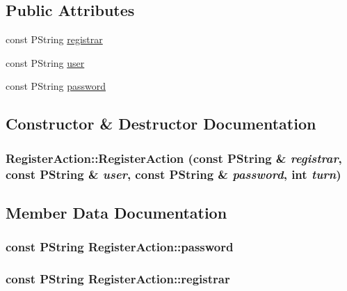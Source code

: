 \subsection*{Public Attributes}
\begin{CompactItemize}
\item 
const PString \hyperlink{classRegisterAction_ac35a1ac2065a7114718b44d205ee8bd}{registrar}
\item 
const PString \hyperlink{classRegisterAction_aa4a6618f15066d50aec6d2a4b07d20f}{user}
\item 
const PString \hyperlink{classRegisterAction_55bb90773d5147d594f8601706a1bcc7}{password}
\end{CompactItemize}


\subsection{Constructor \& Destructor Documentation}
\hypertarget{classRegisterAction_955eec21894f1c59ad8e9692430476f9}{
\subsubsection[{RegisterAction}]{\setlength{\rightskip}{0pt plus 5cm}RegisterAction::RegisterAction (const PString \& {\em registrar}, \/  const PString \& {\em user}, \/  const PString \& {\em password}, \/  int {\em turn})}}
\label{classRegisterAction_955eec21894f1c59ad8e9692430476f9}




\subsection{Member Data Documentation}
\hypertarget{classRegisterAction_55bb90773d5147d594f8601706a1bcc7}{
\subsubsection[{password}]{\setlength{\rightskip}{0pt plus 5cm}const PString {\bf RegisterAction::password}}}
\label{classRegisterAction_55bb90773d5147d594f8601706a1bcc7}


\hypertarget{classRegisterAction_ac35a1ac2065a7114718b44d205ee8bd}{
\subsubsection[{registrar}]{\setlength{\rightskip}{0pt plus 5cm}const PString {\bf RegisterAction::registrar}}}
\label{classRegisterAction_ac35a1ac2065a7114718b44d205ee8bd}



